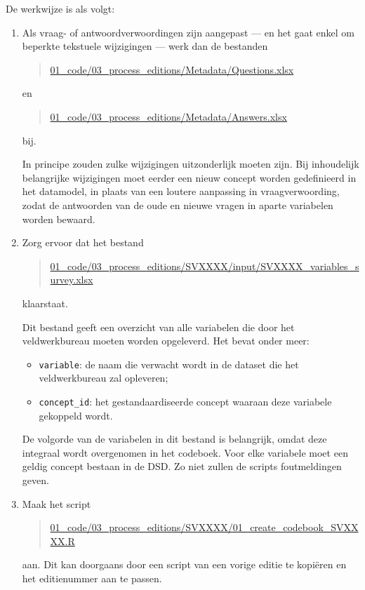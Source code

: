 \documentclass{VSAnote}
\begin{document}
De werkwijze is als volgt:

\begin{enumerate}

\item Als vraag- of antwoordverwoordingen zijn aangepast --- en het gaat enkel om beperkte tekstuele wijzigingen --- werk dan de bestanden
\begin{quote}
\url{01_code/03_process_editions/Metadata/Questions.xlsx}
\end{quote}
en
\begin{quote}
\url{01_code/03_process_editions/Metadata/Answers.xlsx}
\end{quote}
bij.

In principe zouden zulke wijzigingen uitzonderlijk moeten zijn. Bij inhoudelijk belangrijke wijzigingen moet eerder een nieuw concept worden gedefinieerd in het datamodel, in plaats van een loutere aanpassing in vraagverwoording, zodat de antwoorden van de oude en nieuwe vragen in aparte variabelen worden bewaard.

\item Zorg ervoor dat het bestand
\begin{quote}
\url{01_code/03_process_editions/SVXXXX/input/SVXXXX_variables_survey.xlsx}
\end{quote}
klaarstaat.

Dit bestand geeft een overzicht van alle variabelen die door het veldwerkbureau moeten worden opgeleverd. Het bevat onder meer:
\begin{itemize}[nosep]
\item \verb+variable+: de naam die verwacht wordt in de dataset die het veldwerkbureau zal opleveren;
\item \verb+concept_id+: het gestandaardiseerde concept waaraan deze variabele gekoppeld wordt.
\end{itemize}

De volgorde van de variabelen in dit bestand is belangrijk, omdat deze integraal wordt overgenomen in het codeboek. Voor elke variabele moet een geldig concept bestaan in de DSD. Zo niet zullen de scripts foutmeldingen geven.

\item Maak het script
\begin{quote}
\url{01_code/03_process_editions/SVXXXX/01_create_codebook_SVXXXX.R}
\end{quote}
aan. Dit kan doorgaans door een script van een vorige editie te kopiëren en het editienummer aan te passen.


\end{enumerate}
\end{document}
